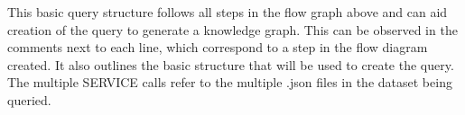 This basic query structure follows all steps in the flow graph above and can aid creation of the query to generate a knowledge graph. This can be observed in the comments next to each line, which correspond to a step in the flow diagram created. It also outlines the basic structure that will be used to create the query. The multiple SERVICE calls refer to the multiple .json files in the dataset being queried. 

